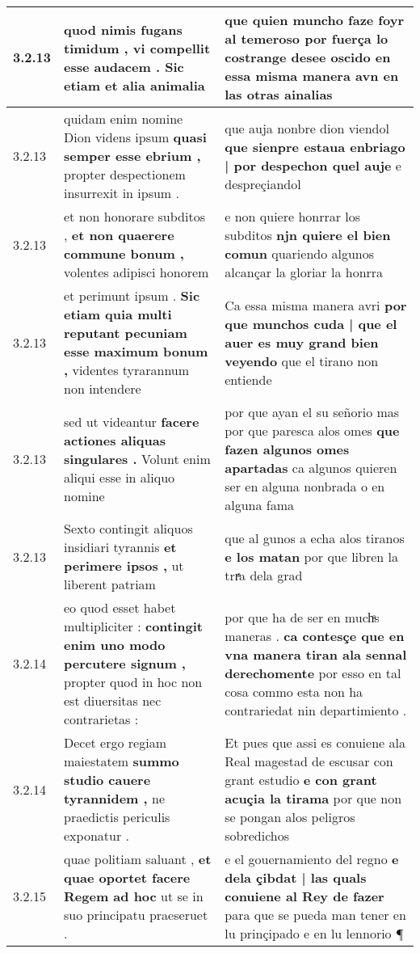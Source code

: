 \begin{tabular}{|p{1cm}|p{6.5cm}|p{6.5cm}|}
3.2.13 & quod nimis fugans timidum , \textbf{ vi compellit esse audacem . } Sic etiam et alia animalia & que quien muncho faze foyr al temeroso \textbf{ por fuerça lo costrange desee oscido en essa misma manera } avn en las otras ainalias \\\hline
3.2.13 & quidam enim nomine Dion videns ipsum \textbf{ quasi semper esse ebrium , } propter despectionem insurrexit in ipsum . & que auja nonbre dion viendol \textbf{ que sienpre estaua enbriago | por despechon quel auje } e despreçiandol \\\hline
3.2.13 & et non honorare subditos , \textbf{ et non quaerere commune bonum , } volentes adipisci honorem & e non quiere honrrar los subditos \textbf{ njn quiere el bien comun } quariendo algunos alcançar la gloriar la honrra \\\hline
3.2.13 & et perimunt ipsum . \textbf{ Sic etiam quia multi reputant pecuniam esse maximum bonum , } videntes tyrarannum non intendere & Ca essa misma manera avri \textbf{ por que munchos cuda | que el auer es muy grand bien veyendo } que el tirano non entiende \\\hline
3.2.13 & sed ut videantur \textbf{ facere actiones aliquas singulares . } Volunt enim aliqui esse in aliquo nomine & por que ayan el su señorio mas por que paresca alos omes \textbf{ que fazen algunos omes apartadas } ca algunos quieren ser en alguna nonbrada o en alguna fama \\\hline
3.2.13 & Sexto contingit aliquos insidiari tyrannis \textbf{ et perimere ipsos , } ut liberent patriam & que al gunos a echa alos tiranos \textbf{ e los matan } por que libren la trrͣa dela grad \\\hline
3.2.14 & eo quod esset habet multipliciter : \textbf{ contingit enim uno modo percutere signum , } propter quod in hoc non est diuersitas nec contrarietas : & por que ha de ser en muchͣs maneras . \textbf{ ca contesçe que en vna manera tiran ala sennal derechomente } por esso en tal cosa commo esta non ha contrariedat nin departimiento . \\\hline
3.2.14 & Decet ergo regiam maiestatem \textbf{ summo studio cauere tyrannidem , } ne praedictis periculis exponatur . & Et pues que assi es conuiene ala Real magestad de escusar con grant estudio \textbf{ e con grant acuçia la tirama } por que non se pongan alos peligros sobredichos \\\hline
3.2.15 & quae politiam saluant , \textbf{ et quae oportet facere Regem ad hoc } ut se in suo principatu praeseruet . & e el gouernamiento del regno \textbf{ e dela çibdat | las quals conuiene al Rey de fazer } para que se pueda man tener en lu prinçipado e en lu lennorio ¶ \\\hline

\end{tabular}
